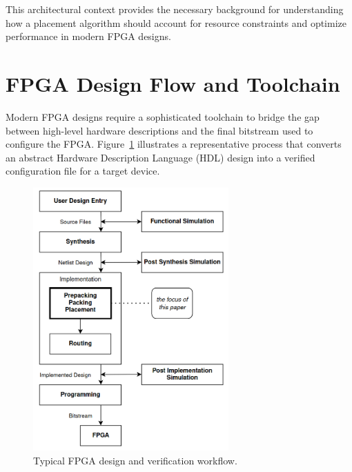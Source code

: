 \documentclass[twocolumn]{article}
\begin{document}
    This architectural context provides the necessary background for understanding how a placement algorithm should account for resource constraints and optimize performance in modern FPGA designs.


\section{FPGA Design Flow and Toolchain}
    \label{sec:fpga_flow_toolchain}

    Modern FPGA designs require a sophisticated toolchain to bridge the gap between high-level hardware descriptions and the final bitstream used to configure the FPGA. 
    Figure~\ref{fig:design_flow} illustrates a representative process that converts an abstract Hardware Description Language (HDL) design into a verified configuration file for a target device.

    \begin{figure}[]
    \centering
    \includegraphics[width=7.5cm]{figures/design_flow.png}
    \caption{Typical FPGA design and verification workflow.}
    \label{fig:design_flow}
    \end{figure}
\end{document}
